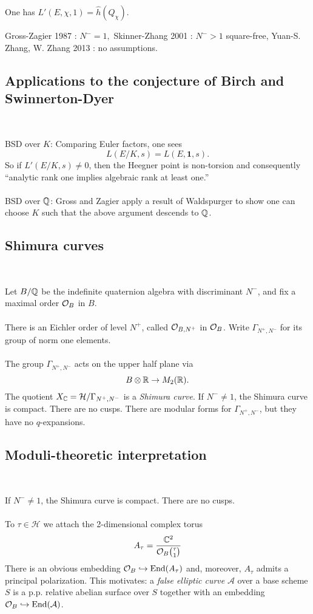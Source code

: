 \documentclass[12pt,amsfont]{amsart}
\begin{document}
\begin{thm} One has $L'(E, \chi, 1) = \widehat{h}(Q_\chi).$
\end{thm}

Gross-Zagier 1987 : $N^{-} = 1,$ Skinner-Zhang 2001 : $N^{-} > 1$ square-free, Yuan-S. Zhang, W. Zhang 2013 : no assumptions.


\subsection{Applications to the conjecture of Birch and Swinnerton-Dyer} 
{\ }

BSD over $K$: Comparing Euler factors, one sees
\[L(E/K, s) = L(E, \textbf{1}, s).\]
So if $L'(E/K, s) \ne 0$, then the Heegner point is non-torsion and consequently ``analytic rank one implies algebraic rank at least one.'' \\ \\
BSD over ${\mathbb Q}$: Gross and Zagier apply a result of Waldspurger to show one can choose $K$ such that the above argument descends to ${\mathbb Q}$. 

\subsection{Shimura curves}
{\ }

Let $B/{\mathbb Q}$ be the indefinite quaternion algebra with discriminant $N^{-}$, and fix a maximal order $\mathcal{O}_B$ in $B$. \\ \\
There is an Eichler order of level $N^+$, called $\mathcal{O}_{B,N^+}$ in $\mathcal{O}_B$. Write $\Gamma_{N^+, N^{-}}$ for its group of norm one elements. \\ \\
The group $\Gamma_{N^+, N^{-}}$ acts on the upper half plane via
\[ B \otimes {\mathbb R} \rightarrow M_2({\mathbb R}).\]
The quotient $X_{\mathbb C} = \mathcal{H}/\Gamma_{N^+, N^{-}}$ is a \emph{Shimura curve}. If $N^{-} \ne 1$, the Shimura curve is compact. There are no cusps. There are modular forms for $\Gamma_{N^+, N^{-}}$, but they have no $q$-expansions.

\subsection{Moduli-theoretic interpretation}
{\ }


If $N^{-} \ne 1$, the Shimura curve is compact. There are no cusps. \\ \\
To $\tau \in \mathcal{H}$ we attach the 2-dimensional complex torus
\[A_\tau = \frac{{\mathbb C}^2}{\mathcal{O}_B \binom{\tau}{1}} \]
There is an obvious embedding $\mathcal{O}_B \hookrightarrow \operatorname{End}(A_\tau)$ and, moreover, $A_\tau$ admits a principal polarization. This motivates: a \emph{false elliptic curve} $\mathcal{A}$ over a base scheme $S$ is a p.p. relative abelian surface over $S$ together with an embedding $\mathcal{O}_B \hookrightarrow \operatorname{End}(\mathcal{A})$. 
\end{document}
